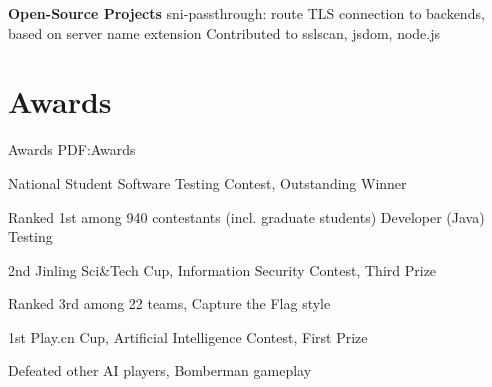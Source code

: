 \documentclass[a4paper,MMMyyyy,nonstop]{simpleresumecv}
\begin{document}
\begin{body}



\GapNoBreak

\textbf{Open-Source Projects}
\BulletItem
sni-passthrough: route TLS connection to backends, based on server name extension
\BulletItem
Contributed to sslscan, jsdom, node.js


\section
{Awards}
{Awards}
{PDF:Awards}

\BulletItem
National Student Software Testing Contest, Outstanding Winner
\hfill
\textbf{  }
\begin{detail}
\SubItem
Ranked 1st among 940 contestants (incl. graduate students)
\SubItem
Developer (Java) Testing
\end{detail}

\BulletItem
2nd Jinling Sci\&Tech Cup, Information Security Contest, Third Prize
\hfill
\textbf{  }
\begin{detail}
\SubItem
Ranked 3rd among 22 teams, Capture the Flag style
\end{detail}

\BulletItem
1st Play.cn Cup, Artificial Intelligence Contest, First Prize
\hfill
\textbf{  }
\begin{detail}
\SubItem
Defeated other AI players, Bomberman gameplay
\end{detail}


\end{body}
\end{document}
